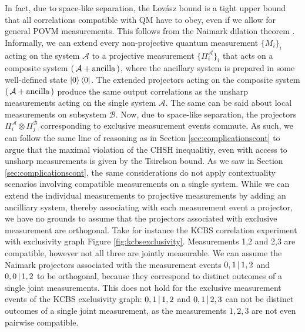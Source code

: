 In fact, due to space-like separation, the Lovász bound is a tight upper bound that all correlations compatible with QM have to obey, even if we allow for general POVM measurements. This follows from the Naimark dilation theorem \cite{Watrous2018}. Informally, we can extend every non-projective quantum measurement $\{M_i\}_i$ acting on the system $\mathcal{A}$ to a projective measurement $\{\Pi_i^{\mathcal{A}}\}_i$ that acts on a composite system $(\thinspace\mathcal{A}+\text{ancilla}\thinspace)$, where the ancillary system is prepared in some well-defined state $\ket{0}\bra{0}$. The extended projectors acting on the composite system $(\thinspace\mathcal{A}+\text{ancilla}\thinspace)$ produce the same output correlations as the unsharp measurements acting on the single system $\mathcal{A}$. The same can be said about local measurements on subsystem $\mathcal{B}$. Now, due to space-like separation, the projectors $\Pi_i^{\mathcal{A}}\otimes \Pi_j^{\mathcal{B}}$ corresponding to exclusive measurement events commute. As such, we can follow the same line of reasoning as in Section \ref{sec:complicationscont} to argue that the maximal violation of the CHSH inequalitiy, even with access to unsharp measurements is given by the Tsirelson bound. As we saw in Section \ref{sec:complicationscont}, the same considerations do not apply contextuality scenarios involving compatible measurements on a single system. While we can extend the individual measurements to projective measurements by adding an ancilliary system, thereby associating with each measurement event a projector, we have no grounds to assume that the projectors associated with exclusive measurement are orthogonal. Take for instance the KCBS correlation experiment with exclusivity graph Figure \ref{fig:kcbsexclusivity}. Measurements 1,2 and 2,3 are compatible, however not all three are jointly measurable. We can assume the Naimark projectors associated with the measurement events $0,1\thinspace\vert\thinspace 1,2$ and $0,0\thinspace\vert\thinspace 1,2$ to be orthogonal, because they correspond to distinct outcomes of a single joint measurements. This does not hold for the exclusive measurement events of the KCBS exclusivity graph: $0,1\thinspace\vert\thinspace 1,2$ and $0,1\thinspace\vert\thinspace 2,3$ can not be distinct outcomes of a single joint measurement, as the measurements $1,2,3$ are not even pairwise compatible.

